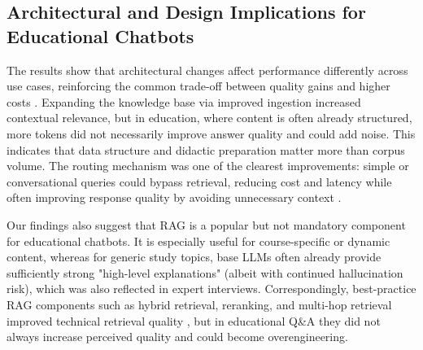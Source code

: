

\subsection{Architectural and Design Implications for Educational Chatbots}

The results show that architectural changes affect performance differently across use cases, reinforcing the common trade-off between quality gains and higher costs \autocite{liBPRAG,Neumann2024MoodleBot}. Expanding the knowledge base via improved ingestion increased contextual relevance, but in education, where content is often already structured, more tokens did not necessarily improve answer quality and could add noise. This indicates that data structure and didactic preparation matter more than corpus volume. The routing mechanism was one of the clearest improvements: simple or conversational queries could bypass retrieval, reducing cost and latency while often improving response quality by avoiding unnecessary context \autocite{liBPRAG,MultiHopRAG}.

Our findings also suggest that RAG is a popular but not mandatory component for educational chatbots. It is especially useful for course-specific or dynamic content, whereas for generic study topics, base LLMs often already provide sufficiently strong "high-level explanations" (albeit with continued hallucination risk), which was also reflected in expert interviews. Correspondingly, best-practice RAG components such as hybrid retrieval, reranking, and multi-hop retrieval improved technical retrieval quality \autocite{liBPRAG,zhaoragSurvey}, but in educational Q\&A they did not always increase perceived quality and could become overengineering.

